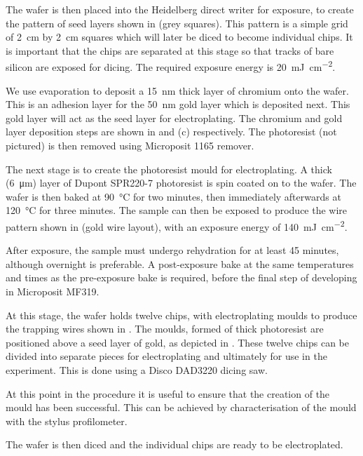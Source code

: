 The wafer is then placed into the Heidelberg direct writer for exposure, to
create the pattern of seed layers shown in  (grey
squares). This pattern is a simple grid of \SI{2}{\centi\meter} by
\SI{2}{\centi\meter} squares which will later be diced to become individual
chips.  It is important that the chips are separated at this stage so that
tracks of bare silicon are exposed for dicing. The required exposure energy is
\SI{20}{\milli\joule\per\centi\meter\squared}.

We use evaporation to deposit a \SI{15}{\nano\meter} thick layer of chromium onto the
wafer. This is an adhesion layer for the \SI{50}{\nano\meter} gold layer which is
deposited next. This gold layer will act as the seed layer for electroplating.
The chromium and gold layer deposition steps are shown in
 and (c) respectively. The photoresist (not
pictured) is then removed using Microposit 1165 remover.

The next stage is to create the photoresist mould for electroplating. A thick
(\SI{6}{\micro\meter}) layer of Dupont SPR220-7 photoresist is spin coated on to the
wafer. The wafer is then baked at \SI{90}{\celsius} for two minutes, then
immediately afterwards at \SI{120}{\celsius} for three minutes. The sample can
then be exposed to produce the wire pattern shown in
 (gold wire layout), with an exposure
energy of \SI{140}{\milli\joule\per\centi\meter\squared}.

After exposure, the sample must undergo rehydration for at least 45 minutes,
although overnight is preferable. A post-exposure bake at the same temperatures
and times as the pre-exposure bake is required, before the final step of
developing in Microposit MF319.

At this stage, the wafer holds twelve chips, with electroplating moulds to
produce the trapping wires shown in . The moulds,
formed of thick photoresist are positioned above a seed layer of gold, as
depicted in . These twelve chips can be divided
into separate pieces for electroplating and ultimately for use in the
experiment. This is done using a Disco DAD3220 dicing saw.

At this point in the procedure it is useful to ensure that the creation of
the mould has been successful. This can be achieved by characterisation of the
mould with the stylus profilometer.
%

The wafer is then diced and the individual chips are ready to be electroplated.

